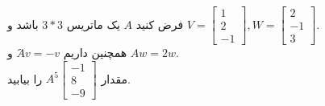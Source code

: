 \documentclass{article}
\begin{document}
	\begin{Exercise*}
		فرض کنید $A$ یک ماتریس $3*3$ باشد و 
		$
			V=
			\begin{bmatrix}
				1\\
				2\\
				-1
			\end{bmatrix}, 
			W=
			\begin{bmatrix}
				2\\
				-1\\
				3
			\end{bmatrix}$.\\
		همچنین داریم $َAv=-v$ و $Aw=2w$.\\
		مقدار 
		$A^5\begin{bmatrix} 
			-1 \\ 
			8 \\ 
			-9 
		\end{bmatrix}$ 
	را بیابید.
		
	\end{Exercise*}
\end{document}
